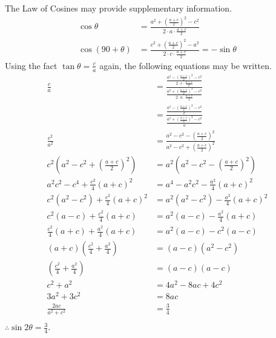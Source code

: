 \documentclass{article}
\begin{document}
The Law of Cosines may provide supplementary information.
\begin{align*}
    \cos\theta &=
        \frac{ a^2 + (\frac{a + c}{2})^2 - c^2 }
            { 2\cdot a \cdot \frac{a + c}{2} } \\
    \cos(90 + \theta) &=
        \frac{ c^2 + (\frac{a + c}{2})^2 - a^2 }
            { 2 \cdot c \cdot \frac{a + c}{2} }
        = -\sin\theta
\end{align*}
Using the fact $\tan\theta = \frac{c}{a}$ again,
the following equations may be written.
\begin{align*}
    \frac{c}{a}
    &= \frac{ \frac{ a^2 - (\frac{a + c}{2})^2 - c^2 }
            { 2 \cdot c \cdot \frac{a + c}{2} } }
            { \frac{ a^2 + (\frac{a + c}{2})^2 - c^2 }
            { 2 \cdot a \cdot \frac{a +c }{2} } } \\
    &= \frac{ \frac{a^2 - (\frac{a + c}{2})^2 - c^2}{c}}
        { \frac{ a^2 + (\frac{a + c}{2})^2 - c^2}{a} } \\
    \frac{c^2}{a^2}
    &= \frac{a^2 - c^2 - (\frac{a + c}{2})^2}
        {a^2 - c^2 + (\frac{a + c}{2})^2} \\
    c^2 \left( a^2 - c^2 + (\frac{a + c}{2})^2 \right)
    &= a^2 \left( a^2 - c^2 - (\frac{a + c}{2})^2 \right) \\
    a^2 c^2 - c^4 + \frac{c^2}{4} (a + c)^2
    &= a^4 - a^2 c^2 - \frac{a^2}{4}(a + c)^2 \\
    c^2 (a^2 - c^2) + \frac{c^2}{4} (a + c)^2
    &=a^2 (a^2 - c^2) - \frac{a^2}{4}(a + c)^2 \\
    c^2 (a - c) + \frac{c^2}{4} (a + c)
    &=a^2(a - c) - \frac{a^2}{4}(a + c) \\
    \frac{c^2}{4} (a + c) + \frac{a^2}{4} (a + c)
    &= a^2(a - c) - c^2(a - c) \\
    (a + c) ( \frac{c^2}{4} + \frac{a^2}{4} )
    &= (a - c)(a^2 - c^2) \\
    ( \frac{c^2}{4} + \frac{a^2}{4} )
    &= (a - c)(a - c) \\
    c^2 + a^2 &= 4a^2 - 8ac + 4c^2 \\
    3a^2 + 3c^2 &= 8ac \\
    \frac{2ac}{a^2 + c^2} &= \frac{3}{4} \\
\end{align*}
$\therefore \sin2\theta = \boxed{\frac{3}{4}}$.

\newpage
\end{document}

